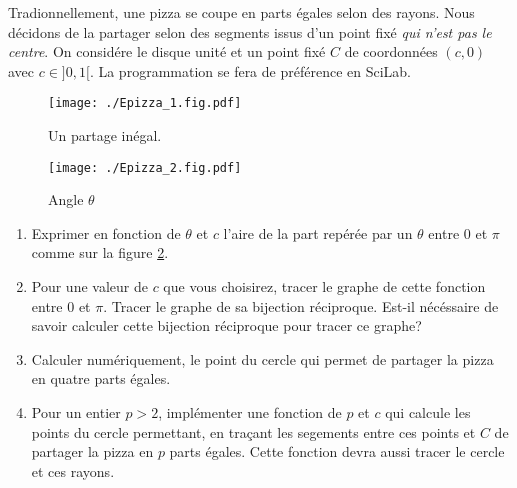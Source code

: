 Tradionnellement, une pizza se coupe en parts égales selon des rayons. Nous décidons de la partager selon des segments issus d'un point fixé \emph{qui n'est pas le centre}.\newline
On considére le disque unité et un point fixé $C$ de coordonnées $(c,0)$ avec $c \in]0,1[$.\newline
La programmation se fera de préférence en SciLab.
\begin{figure}[h]
  \centering
  \texttt{[image: ./Epizza\_1.fig.pdf]}
  \caption{Un partage inégal.}
  \label{fig:Epizza_1}
\end{figure}
\begin{figure}[h]
  \centering
  \texttt{[image: ./Epizza\_2.fig.pdf]}
  \caption{Angle $\theta$}
  \label{fig:Epizza_2}
\end{figure}
\begin{enumerate}
  \item Exprimer en fonction de $\theta$ et $c$ l'aire de la part repérée par un $\theta$ entre $0$ et $\pi$ comme sur la figure \ref{fig:Epizza_2}.
  \item Pour une valeur de $c$ que vous choisirez, tracer le graphe de cette fonction entre $0$ et $\pi$. Tracer le graphe de sa bijection réciproque. Est-il nécéssaire de savoir calculer cette bijection réciproque pour tracer ce graphe?
  \item Calculer numériquement, le point du cercle qui permet de partager la pizza en quatre parts égales.
  \item Pour un entier $p>2$, implémenter une fonction de $p$ et $c$ qui calcule les points du cercle permettant, en traçant les segements entre ces points et $C$ de partager la pizza en $p$ parts égales. Cette fonction devra aussi tracer le cercle et ces rayons.\newline
\end{enumerate}
